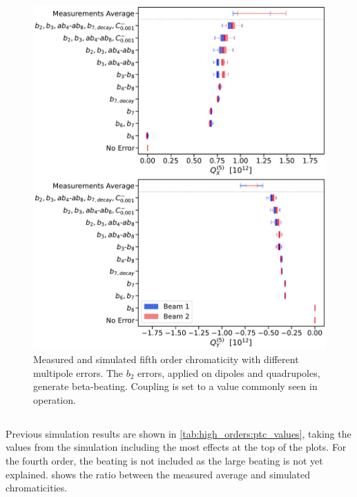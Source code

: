 \begin{figure}[!htb]
    \centering
    \includegraphics[width=0.9\columnwidth]{images/q5_ptc.pdf}
    \caption{Measured and simulated fifth order chromaticity with different multipole errors. The
    $b_2$ errors, applied on dipoles and quadrupoles, generate beta-beating. Coupling is set to a
    value commonly seen in operation.}
    \label{fig:high_orders:beam1_q5_ptc}
\end{figure}



\subsection{}

Previous simulation results are shown in \cref{tab:high_orders:ptc_values}, taking the values from 
the simulation including the most effects at the top of the plots. For the fourth order, the beating
is not included as the large beating is not yet explained.
 shows the ratio between the measured average and simulated
chromaticities.


